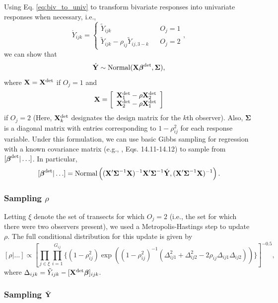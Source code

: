 \documentclass[10pt]{article}
\begin{document}
Using Eq. \ref{eq:biv_to_univ} to transform bivariate responses into univariate responses when necessary, i.e.,
$$
\acute{Y}_{ijk}=
    \left\{ \begin{array}{lll}
				\tilde{Y}_{ijk} & & O_j=1\\
			    \tilde{Y}_{ijk}-\rho_{ij}\tilde{Y}_{ij,3-k} & & O_j=2
		\end{array}, \right.
$$
we can show that
$$
\acute{{\bf Y}} \sim {\rm Normal}({\bf X} \boldsymbol{\beta}^{\rm det},\boldsymbol{\Sigma}),
$$
where ${\bf X}={\bf X}^{\rm det}$ if $O_j=1$ and
$$
{\bf X}=\left[ \begin{array}{l}
    {\bf X}_1^{\rm det} - \rho {\bf X}_2^{\rm det} \\
    {\bf X}_2^{\rm det} - \rho {\bf X}_1^{\rm det}
    \end{array}
    \right]
$$
if $O_j=2$ (Here, ${\bf X}_k^{\rm det}$ designates the design matrix for the $k$th observer).
Also, $\boldsymbol{\Sigma}$ is a diagonal matrix with entries corresponding to $1-\rho_{ij}^2$ for each response variable.  Under this formulation, we can use basic Gibbs sampling for regression with a known covariance matrix (e.g., \cite{GelmanEtAl2004}, Eqs. 14.11-14.12) to sample from $[\boldsymbol{\beta}^{\rm det}|\hdots]$.  In particular,
$$
[\boldsymbol{\beta}^{\rm det}|\hdots]=\textrm{Normal}\left( ({\bf X}^\prime \boldsymbol{\Sigma}^{-1} {\bf X})^{-1}{\bf X}^\prime \boldsymbol{\Sigma}^{-1} \acute{{\bf Y}},
({\bf X}^\prime \boldsymbol{\Sigma}^{-1} {\bf X})^{-1} \right).
$$



\subsubsection*{Sampling $\rho$}

Letting $\xi$ denote the set of transects for which $O_j=2$ (i.e., the set for which there were two observers present), we used a Metropolis-Hastings step to update $\rho$.  The full conditional distribution for this update is given by
$$
  [\rho|\hdots] \propto \left[ \prod_{j \in \xi} \prod_{i=1}^{G_{ij}}
  \{
(1-\rho_{ij}^2)\exp\left(
(1-\rho_{ij}^2)^{-1} (\Delta_{ij1}^2+\Delta_{ij2}^2-2\rho_{ij}\Delta_{ij1}\Delta_{ij2})
  \right)
  \}
  \right]^{-0.5},
$$
where $\Delta_{ijk}=\tilde{Y}_{ijk}-[{\bf X}^{\rm det} \boldsymbol{\beta}]_{ijk}$.

\subsubsection*{Sampling $\tilde{\bf Y}$}
\end{document}
